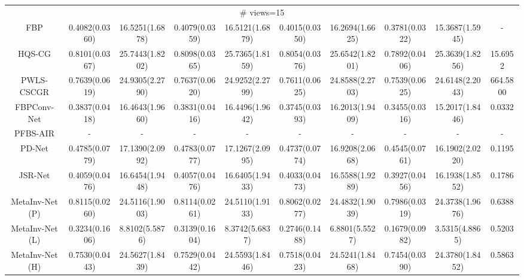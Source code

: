 \documentclass[journal,twoside]{IEEEtran}
\begin{document}
\begin{table*}[ht]
\begin{tabular}{|c|c|c|c|c|c|c|c|c|c|}
 \multicolumn{10}{|c|}{\cellcolor{gbygreen}\# views=15} \\
 \cline{1-10}
FBP 
&0.4082(0.0360) &16.5251(1.6878) 
&0.4079(0.0359) &16.5121(1.6879) 
&0.4015(0.0350) &16.2694(1.6625) 
&0.3781(0.0322) &15.3687(1.5945) & - \\
    \cline{1-10}
HQS-CG 
 &\cellcolor{gbyblue} 0.8101(0.0367) &\cellcolor{gbypink} 25.7443(1.8202) 
 &\cellcolor{gbyblue}0.8098(0.0365) &\cellcolor{gbypink}25.7365(1.8159) 
 &\cellcolor{gbyblue}0.8054(0.0376) &\cellcolor{gbypink}25.6542(1.8201) 
 &\cellcolor{gbyblue}0.7892(0.0406) &\cellcolor{gbypink}25.3639(1.8256) &15.6952 \\
    \cline{1-10}
PWLS-CSCGR
  &0.7639(0.0619) &\cellcolor{gbyblue}24.9305(2.2790) 
  &0.7637(0.0620) &\cellcolor{gbyblue}24.9252(2.2799)
  &0.7611(0.0625) &\cellcolor{gbyblue}24.8588(2.2703) 
  &0.7539(0.0625) &\cellcolor{gbyblue}24.6148(2.2043) &664.5800 \\
    \cline{1-10}
FBPConv-Net
&0.3837(0.0418) &16.4643(1.9660) 
&0.3831(0.0416) &16.4496(1.9642) 
&0.3745(0.0393) &16.2013(1.9409) 
&0.3455(0.0316) &15.2017(1.8446) &0.0332 \\
    \cline{1-10}
PFBS-AIR 
&- &- &- &- &- &- &- &- &-\\
    \cline{1-10}
PD-Net 
&0.4785(0.0779) &17.1390(2.0992) 
&0.4783(0.0777) &17.1267(2.0995) 
&0.4737(0.0774) &16.9208(2.0668) 
&0.4545(0.0761) &16.1902(2.0220) &0.1195 \\
  \cline{1-10}
JSR-Net 
&0.4059(0.0476) &16.6454(1.9448) 
&0.4057(0.0476) &16.6405(1.9433) 
&0.4033(0.0473) &16.5588(1.9289) 
&0.3927(0.0456) &16.1938(1.8552) &0.1786 \\
  \cline{1-10}
MetaInv-Net (P) 
&\cellcolor{gbypink}0.8115(0.0260) &24.5116(1.9003)
&\cellcolor{gbypink}0.8114(0.0261) &24.5110(1.9133) 
&\cellcolor{gbypink}0.8062(0.0277) &24.4832(1.9039) 
&\cellcolor{gbypink}0.7986(0.0319) &24.3738(1.9676) &0.6388\\
  \cline{1-10}
MetaInv-Net (L)
 &0.3234(0.1606) &8.8102(5.5876) 
 &0.3139(0.1604) &8.3742(5.6837) 
 &0.2746(0.1488) &6.8801(5.5527) 
 &0.1679(0.0982) &3.5315(4.8865) &0.5203\\
  \cline{1-10}
MetaInv-Net (H) 
&0.7530(0.0443) &24.5627(1.8439) 
&0.7529(0.0442) &24.5593(1.8446) 
&0.7518(0.0423) &24.5241(1.8468) 
&0.7454(0.0390) &24.3780(1.8452) &0.5863\\
 \cline{1-10}
  

\end{tabular}
\end{table*}
\end{document}
